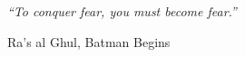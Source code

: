 \pagestyle{fancy}  %

\clearpage  %




\pagestyle{empty}  %

\null\vfill
\textit{``To conquer fear, you must become fear.''}

\begin{flushright}
Ra's al Ghul, Batman Begins
\end{flushright}

\vfill\vfill\vfill\vfill\vfill\vfill\null
\clearpage  %




